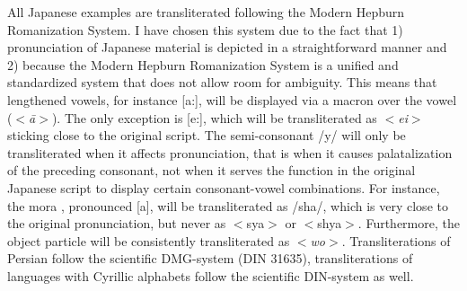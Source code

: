 All Japanese examples are transliterated following the Modern Hepburn Romanization System. I have chosen this system due to the fact that 1) pronunciation of Japanese material is depicted in a straightforward manner and 2) because the Modern Hepburn Romanization System is a unified and standardized system that does not allow room for ambiguity. This means that lengthened vowels, for instance [a:], will be displayed via a macron over the vowel ($<$\textit{ā}$>$). The only exception is [e:], which will be transliterated as $<$\textit{ei}$>$ sticking close to the original script. The semi-consonant /y/ will only be transliterated when it affects pronunciation, that is when it causes palatalization of the preceding consonant, not when it serves the function in the original Japanese script to display certain consonant-vowel combinations. For instance, the mora , pronounced [\textctc a], will be transliterated as /sha/, which is very close to the original pronunciation, but never as $<$sya$>$ or $<$shya$>$. Furthermore, the object particle will be consistently transliterated as $<$\textit{wo}$>$. Transliterations of Persian follow the scientific DMG-system (DIN 31635), transliterations of languages with Cyrillic alphabets follow the scientific DIN-system as well.




